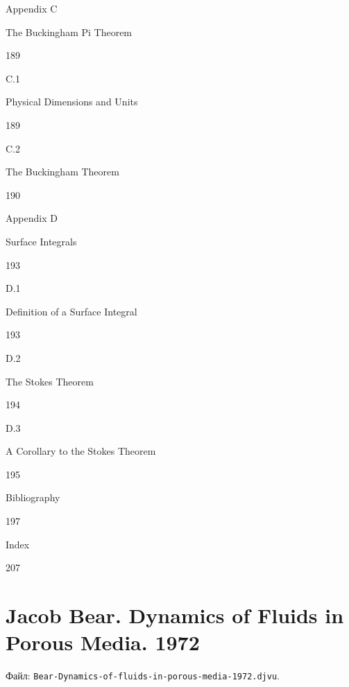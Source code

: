 \documentclass[
  11pt,
]{article}
\begin{document}
Appendix C\par
The Buckingham Pi Theorem\par
189\par
C.1\par
Physical Dimensions and Units\par
189\par
C.2\par
The Buckingham Theorem\par
190\par
Appendix D\par
Surface Integrals\par
193\par
D.1\par
Definition of a Surface Integral\par
193\par
D.2\par
The Stokes Theorem\par
194\par
D.3\par
A Corollary to the Stokes Theorem\par
195\par
Bibliography\par
197\par
Index\par
207\par
\endgroup


\section{Jacob Bear. Dynamics of Fluids in Porous Media. 1972}\label{section-14}

Файл: \texttt{Bear-Dynamics-of-fluids-in-porous-media-1972.djvu}.
\end{document}
